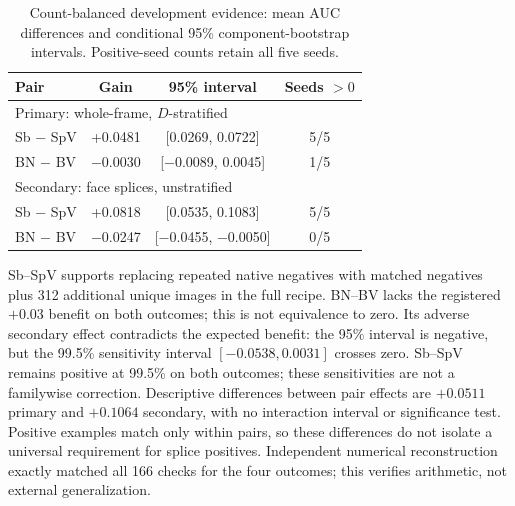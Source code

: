 \begin{table}[t]
\centering\small
\caption{Count-balanced development evidence: mean AUC differences and conditional 95\% component-bootstrap intervals. Positive-seed counts retain all five seeds.}
\label{tab:count_balanced}
\begin{tabular}{lccc}
\toprule
Pair & Gain & 95\% interval & Seeds $>0$ \\
\midrule
\multicolumn{4}{l}{Primary: whole-frame, $D$-stratified} \\
Sb $-$ SpV & +0.0481 & [0.0269, 0.0722] & 5/5 \\
BN $-$ BV & $-$0.0030 & [$-$0.0089, 0.0045] & 1/5 \\
\midrule
\multicolumn{4}{l}{Secondary: face splices, unstratified} \\
Sb $-$ SpV & +0.0818 & [0.0535, 0.1083] & 5/5 \\
BN $-$ BV & $-$0.0247 & [$-$0.0455, $-$0.0050] & 0/5 \\
\bottomrule
\end{tabular}
\end{table}

Sb--SpV supports replacing repeated native negatives with matched negatives plus 312 additional unique images in the full recipe. BN--BV lacks the registered $+0.03$ benefit on both outcomes; this is not equivalence to zero. Its adverse secondary effect contradicts the expected benefit: the 95\% interval is negative, but the 99.5\% sensitivity interval $[-0.0538,0.0031]$ crosses zero. Sb--SpV remains positive at 99.5\% on both outcomes; these sensitivities are not a familywise correction. Descriptive differences between pair effects are $+0.0511$ primary and $+0.1064$ secondary, with no interaction interval or significance test. Positive examples match only within pairs, so these differences do not isolate a universal requirement for splice positives. Independent numerical reconstruction exactly matched all 166 checks for the four outcomes; this verifies arithmetic, not external generalization.

